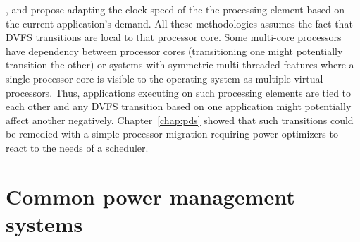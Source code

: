 \cite{AnIntraTask}, \cite{LiveRuntime} and \cite{Phaseaware} propose adapting the clock speed of the the processing element based
on the current application's demand. All these methodologies assumes the fact that DVFS transitions
are local to that processor core. Some multi-core processors have dependency between 
processor cores (transitioning one might potentially transition the other) or systems with 
symmetric multi-threaded features where a single processor
core is visible to the operating system as multiple virtual processors. Thus, applications
executing on such processing elements are tied to each other and any DVFS
transition based on one application might potentially affect another negatively. 
Chapter~\ref{chap:pds} showed that such transitions could be remedied with a simple processor migration
requiring power optimizers to react to the needs of a scheduler.

\section{Common power management systems}~\label{sec:common_pow}

